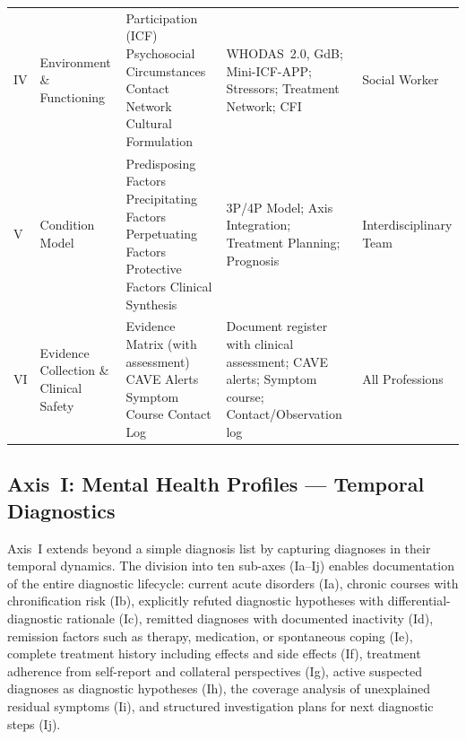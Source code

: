 \documentclass[11pt,a4paper]{article}
\begin{document}
\begin{table}[H]
\begin{tabularx}{\textwidth}{@{}L{0.8cm}L{2.1cm}L{3.3cm}Y L{2.2cm}@{}}
\addlinespace
IV & Environment \& Functioning & Participation (ICF) \newline Psychosocial Circumstances \newline Contact Network \newline Cultural Formulation & WHODAS~2.0, GdB; Mini-ICF-APP; Stressors; Treatment Network; CFI & Social Worker \\
\addlinespace
V & Condition Model & Predisposing Factors \newline Precipitating Factors \newline Perpetuating Factors \newline Protective Factors \newline Clinical Synthesis & 3P/4P Model; Axis Integration; Treatment Planning; Prognosis & Interdisciplinary Team \\
\addlinespace
VI & Evidence Collection \& Clinical Safety & Evidence Matrix (with assessment) \newline CAVE Alerts \newline Symptom Course \newline Contact Log & Document register with clinical assessment; CAVE alerts; Symptom course; Contact/Observation log & All Professions \\
\bottomrule
\end{tabularx}
\normalsize
\end{table}

\subsection{Axis~I: Mental Health Profiles --- Temporal Diagnostics}
\label{sec:axis1}

Axis~I extends beyond a simple diagnosis list by capturing diagnoses in their temporal dynamics. The division into ten sub-axes (Ia--Ij) enables documentation of the entire diagnostic lifecycle: current acute disorders (Ia), chronic courses with chronification risk (Ib), explicitly refuted diagnostic hypotheses with differential-diagnostic rationale (Ic), remitted diagnoses with documented inactivity (Id), remission factors such as therapy, medication, or spontaneous coping (Ie), complete treatment history including effects and side effects (If), treatment adherence from self-report and collateral perspectives (Ig), active suspected diagnoses as diagnostic hypotheses (Ih), the coverage analysis of unexplained residual symptoms (Ii), and structured investigation plans for next diagnostic steps (Ij).
\end{document}
